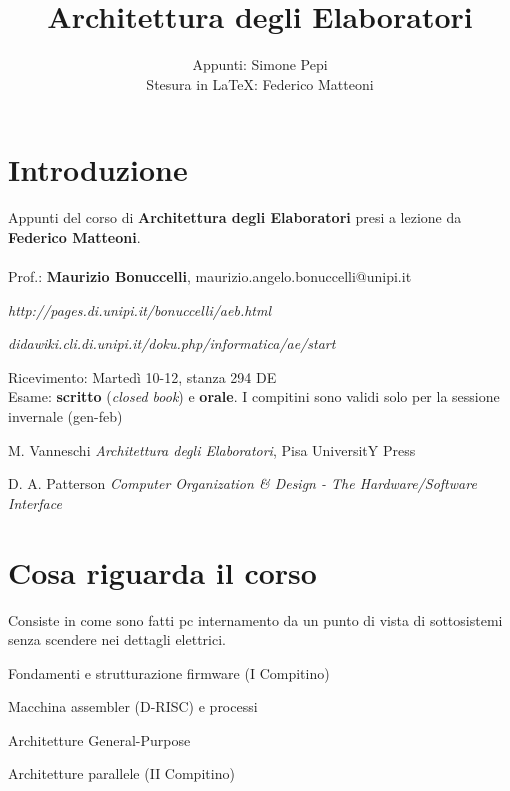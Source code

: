 \documentclass[10pt]{report}
\begin{document}
\title{Architettura degli Elaboratori}
\author{Appunti: Simone Pepi\\Stesura in \LaTeX: Federico Matteoni}
\date{ }
\renewcommand*\contentsname{Indice}

\maketitle
\tableofcontents
\pagebreak
\section{Introduzione}
Appunti del corso di \textbf{Architettura degli Elaboratori} presi a lezione da \textbf{Federico Matteoni}.\\\\
Prof.: \textbf{Maurizio Bonuccelli}, maurizio.angelo.bonuccelli@unipi.it\\
\begin{list}{-}{Riferimenti web:}
\item \emph{http://pages.di.unipi.it/bonuccelli/aeb.html}
\item \emph{didawiki.cli.di.unipi.it/doku.php/informatica/ae/start}
\end{list}
Ricevimento: Martedì 10-12, stanza 294 DE\\
Esame: \textbf{scritto} (\textit{closed book}) e \textbf{orale}. I compitini sono validi solo per la sessione invernale (gen-feb)\\
\begin{list}{-}{Libri}
\item  M. Vanneschi \textit{Architettura degli Elaboratori}, Pisa UniversitY Press
\item D. A. Patterson \textit{Computer Organization \& Design - The Hardware/Software Interface}
\end{list}
\section{Cosa riguarda il corso}
Consiste in come sono fatti pc internamento da un punto di vista di sottosistemi senza scendere nei dettagli elettrici.
\begin{list}{-}{Il corso è diviso in quattro parti:}
\item Fondamenti e strutturazione firmware (I Compitino)
\item Macchina assembler (D-RISC) e processi
\item Architetture General-Purpose
\item Architetture parallele (II Compitino)
\end{list}
\end{document}
